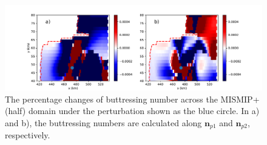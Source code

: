 \documentclass[tc, manuscript]{copernicus}
\begin{document}
\begin{figure}
	\centering
    \includegraphics[width=1\linewidth]{figs/sigma_change_example.pdf}
    \caption{The percentage changes of buttressing number across the MISMIP+ (half) domain under the perturbation shown as the blue circle. In a) and b), the buttressing numbers are calculated along $\mathbf{n}_{p1}$ and $\mathbf{n}_{p2}$, respectively.}
	\label{sigma_change_example}
\end{figure}
\end{document}
